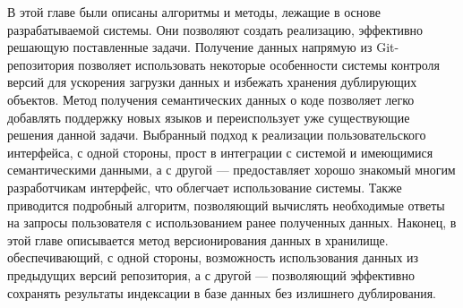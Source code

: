 В этой главе были описаны алгоритмы и методы, лежащие в основе разрабатываемой системы. Они позволяют создать реализацию, эффективно решающую поставленные задачи. Получение данных напрямую из Git-репозитория позволяет использовать некоторые особенности системы контроля версий для ускорения загрузки данных и избежать хранения дублирующих объектов. Метод получения семантических данных о коде позволяет легко добавлять поддержку новых языков и переиспользует уже существующие решения данной задачи. Выбранный подход к реализации пользовательского интерфейса, с одной стороны, прост в интеграции с системой и имеющимися семантическими данными, а с другой — предоставляет хорошо знакомый многим разработчикам интерфейс, что облегчает использование системы. Также приводится подробный алгоритм, позволяющий вычислять необходимые ответы на запросы пользователя с использованием ранее полученных данных. Наконец, в этой главе описывается метод версионирования данных в хранилище. обеспечивающий, с одной стороны, возможность использования данных из предыдущих версий репозитория, а с другой — позволяющий эффективно сохранять результаты индексации в базе данных без излишнего дублирования.

\clearpage